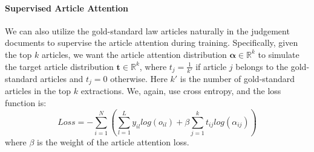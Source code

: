 \paragraph{Supervised Article Attention}
We can also utilize the gold-standard law articles naturally in the judgement documents
to supervise the article attention during training. Specifically, given the top $k$ articles, we want the article attention distribution $\bm{\alpha}\in\mathbb{R}^k$ to simulate the target article distribution $\mathbf{t}\in\mathbb{R}^k$, where $t_j=\frac{1}{k'}$ if article $j$ belongs to the gold-standard articles and $t_j=0$ otherwise. Here $k'$ is the number of gold-standard articles in the top $k$ extractions.
%
%
We, again, use cross entropy, and the loss function is:
\begin{equation}
\label{final_loss}
Loss = -\sum_{i=1}^N(\sum_{l=1}^L{y_{il} log(o_{il})} + \beta \sum_{j=1}^k{t_{ij} log(\alpha_{ij})})
\end{equation}
where $\beta$ is the weight of the article attention loss.




